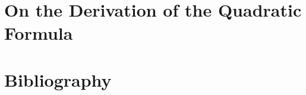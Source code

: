 \documentclass[final,3p,times,twocolumn]{elsarticle}
\begin{document}
\appendix

\section{On the Derivation of the Quadratic Formula}
\label{app:quad}


\section*{Bibliography}








\end{document}
